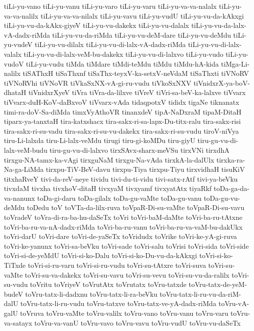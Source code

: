 {tiLi-yu-vano
tiLi-yu-vanu
tiLi-yu-varo
tiLi-yu-varu
tiLi-yu-va-va-nalalx
tiLi-yu-va-va-nalilx
tiLi-yu-va-va-nilalx
tiLi-yu-vavu
tiLi-yu-vudU
tiLi-yu-vu-da-kAkxgi
tiLi-yu-vu-da-kAkx-giyeV
tiLi-yu-vu-dakekx
tiLi-yu-vu-dalalx
tiLi-yu-vu-da-lalx-vA-dadx-riMda
tiLi-yu-vu-da-riMda
tiLi-yu-vu-deM-dare
tiLi-yu-vu-deMdu
tiLi-yu-vudeV
tiLi-yu-vu-dilalx
tiLi-yu-vu-di-lalx-vA-dadx-riMda
tiLi-yu-vu-di-lalx-valalx
tiLi-yu-vu-di-lalx-veM-bu-dakekx
tiLi-yu-vu-di-lalxvo
tiLi-yu-vudo
tiLi-yu-vudoV
tiLi-yu-vudu
tiMda
tiMdare
tiMdi-teMdu
tiMdu
tiMdu-hA-kida
tiMga-Li-nalilx
tiSAThxH
tiSaThxnf
tiSaThx-teyxV-ka-setxV-neVdaM
tiSaThxti
tiVNoRV
tiVNoRVhi
tiVNoVR
tiVkaSxNX-vA-gi-ru-vudu
tiVkoSxNXV
tiVnidxrX-ya-boV-dhataH
tiVnidxrXyeV
tiVra
tiVra-da-lilxve
tiVreV
tiVri-sa-beV-ka-lalxve
tiVvarx
tiVvarx-duH-KoV-daBxvoV
tiVvarx-vAda
tidaqpotxV
tididx
tigaNe
tiknanatx
timi-ra-doV-Sa-diMda
timxVyAthoVR
tinanxdeV
tipA-NaDxraM
tipaM-DitaH
tiparx-ya-tanxtaH
tira-katxshacx
tira-sakx-ri-sa-lapx-Du-titx-ralu
tira-sakx-risi
tira-sakx-ri-su-vadu
tira-sakx-ri-su-vu-dakekx
tira-sakx-ri-su-vudu
tiroV-niVya
tiru-Li-lalxda
tiru-Li-lalx-veMdu
tirugi
tiru-gi-koMDu
tiru-giyU
tiru-gu-vu-di-lalx-veM-budu
tiru-gu-vu-di-lalxvo
tirxSAvx-sharx-meVSu
tirxVNi
tirxdhA
tirxgu-NA-tamx-ka-vAgi
tirxguNaM
tirxgu-Na-vAda
tirxkA-la-dalUlx
tirxka-ra-Na-ga-LiMda
tirxpu-TiV-BeV-davu
tirxpu-Tiya
tirxpu-Tiyu
tirxvidhaH
tisuKiV
titxhaRveY
tivi-da-reV-neye
tividu
tivi-du-ti-vidu
tivi-satx-rAtf
tivi-ya-beVku
tivxdaM
tivxha
tivxhoV-ditaH
tivxyaM
tivxyamf
tivxyatAtx
tiyaRkf
toDa-ga-da-va-nanunx
toDa-gi-daru
toDa-gilalx
toDa-gu-vaMte
toDa-gu-vanu
toDa-gu-vu-deMdu
toDedu
toV
toVTa-da-lilx-ruva
toVpaR-Di-su-vaMte
toVpaR-Di-su-vavu
toVradeV
toVra-di-ra-ba-hu-daSeTx
toVri
toVri-baM-daMte
toVri-ba-ru-tAtxne
toVri-ba-ru-va-nA-dadx-riMda
toVri-ba-ru-vanu
toVri-ba-ru-va-vaM-bu-dakUkx
toVri-darU
toVri-dare
toVri-de-yaSeTx
toVridudx
toVrike
toVri-ke-yA-gi-ruva
toVri-ke-yanunx
toVri-sa-beVku
toVri-sade
toVri-salu
toVrisi
toVri-sida
toVri-side
toVri-si-de-yeMdU
toVri-si-ko-Dalu
toVri-si-ko-Du-vu-da-kAkxgi
toVri-si-ko-TiTxde
toVri-si-ru-varu
toVri-si-ru-vudu
toVri-su-tAtxre
toVri-suva
toVri-su-vaMte
toVri-su-va-dakekx
toVri-su-vavu
toVri-su-vevu
toVri-su-vu-da-ralilx
toVri-su-vudu
toVritu
toVriyeV
toVrutAtx
toVrutatx
toVru-tatxde
toVru-tatx-de-yeM-budeV
toVru-tatx-li-dadxnu
toVru-tatx-li-ra-beVku
toVru-tatx-li-ru-vu-da-riM-dalU
toVru-tatx-li-ru-vudu
toVru-tatxve
toVru-tatx-ve-yA-dadx-riMda
toVru-vA-galU
toVruva
toVru-vaMte
toVru-valilx
toVru-vano
toVru-vanu
toVru-varu
toVru-va-satayx
toVru-va-vanU
toVru-vavo
toVru-vavu
toVru-vudU
toVru-vu-daSeTx
}
